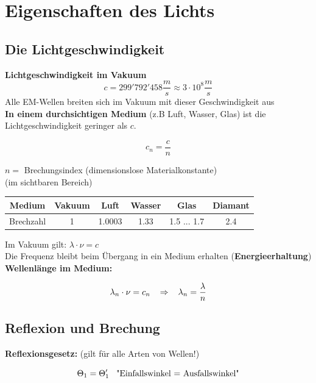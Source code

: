 \section{Eigenschaften des Lichts}

\subsection{Die Lichtgeschwindigkeit}
\textbf{Lichtgeschwindigkeit im Vakuum}
\[
    c = 299'792'458 \frac{m}{s} \approx 3\cdot10^8 \frac{m}{s}
\]
Alle EM-Wellen breiten sich im Vakuum mit dieser Geschwindigkeit aus \\[2ex]

\textbf{In einem durchsichtigen Medium} (z.B Luft, Wasser, Glas) ist die Lichtgeschwindigkeit geringer als $c$. \\[1ex]
\begin{formulabox}
    \[
        c_n = \frac{c}{n}
    \]
\end{formulabox}
\hspace{5mm} $n = $ Brechungsindex (dimensionslose Materialkonstante)
\\[1ex]

(im sichtbaren Bereich)\\
\begin{tabular}{|c|c|c|c|c|c|}
  \hline
  Medium & Vakuum & Luft & Wasser & Glas & Diamant \\
  \hline
  Brechzahl & 1 & 1.0003 & 1.33 & 1.5 ... 1.7 & 2.4 \\
  \hline
\end{tabular}
\vspace{1mm}

Im Vakuum gilt: $\lambda \cdot \nu = c$ \\[1ex]

Die Frequenz bleibt beim Übergang in ein Medium erhalten (\textbf{Energieerhaltung}) \\[1ex]
\textbf{Wellenlänge im Medium:}
\begin{formulabox}
    \[
        \lambda_n \cdot \nu = c_n \hspace{3mm} \Rightarrow \hspace{3mm} \lambda_n = \frac{\lambda}{n}
    \]
\end{formulabox}

\subsection{Reflexion und Brechung}
\textbf{Reflexionsgesetz:} (gilt für alle Arten von Wellen!)
\begin{formulabox}
    \[
        \Theta_1 = \Theta_1' \hspace{3mm} \text{"Einfallswinkel = Ausfallswinkel"}
    \]
\end{formulabox} 

